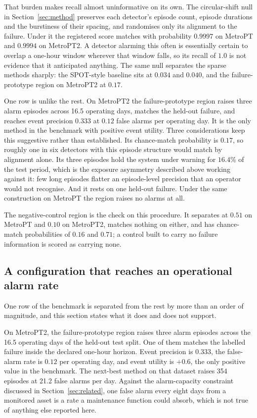 That burden makes recall almost uninformative on its own. The circular-shift null in Section~\ref{sec:method} preserves each detector's episode count, episode durations and the burstiness of their spacing, and randomises only its alignment to the failure. Under it the registered score matches with probability \(0.9997\) on MetroPT and \(0.9994\) on MetroPT2. A detector alarming this often is essentially certain to overlap a one-hour window wherever that window falls, so its recall of \(1.0\) is not evidence that it anticipated anything. The same null separates the sparse methods sharply: the SPOT-style baseline sits at \(0.034\) and \(0.040\), and the failure-prototype region on MetroPT2 at \(0.17\).

One row is unlike the rest. On MetroPT2 the failure-prototype region raises three alarm episodes across 16.5 operating days, matches the held-out failure, and reaches event precision \(0.333\) at \(0.12\) false alarms per operating day. It is the only method in the benchmark with positive event utility. Three considerations keep this suggestive rather than established. Its chance-match probability is \(0.17\), so roughly one in six detectors with this episode structure would match by alignment alone. Its three episodes hold the system under warning for \(16.4\%\) of the test period, which is the exposure asymmetry described above working against it: few long episodes flatter an episode-level precision that an operator would not recognise. And it rests on one held-out failure. Under the same construction on MetroPT the region raises no alarms at all.

The negative-control region is the check on this procedure. It separates at \(0.51\) on MetroPT and \(0.10\) on MetroPT2, matches nothing on either, and has chance-match probabilities of \(0.16\) and \(0.71\); a control built to carry no failure information is scored as carrying none.


\subsection{A configuration that reaches an operational alarm rate}
\label{sec:plausible-rate}

One row of the benchmark is separated from the rest by more than an order of magnitude, and this section states what it does and does not support.

On MetroPT2, the failure-prototype region raises three alarm episodes across the 16.5 operating days of the held-out test split. One of them matches the labelled failure inside the declared one-hour horizon. Event precision is \(0.333\), the false-alarm rate is \(0.12\) per operating day, and event utility is \(+0.6\), the only positive value in the benchmark. The next-best method on that dataset raises 354 episodes at 21.2 false alarms per day. Against the alarm-capacity constraint discussed in Section~\ref{sec:related}, one false alarm every eight days from a monitored asset is a rate a maintenance function could absorb, which is not true of anything else reported here.

